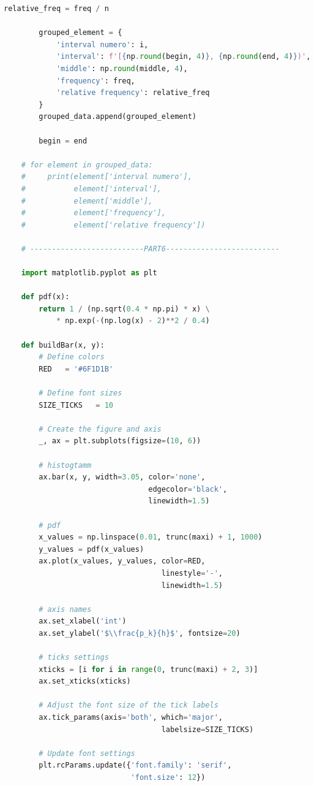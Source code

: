\documentclass[a4paper, 14pt]{extarticle}
\begin{document}
\begin{center}
\begin{lstlisting}[language=Python]
        relative_freq = freq / n

        grouped_element = {
            'interval numero': i,
            'interval': f'[{np.round(begin, 4)}, {np.round(end, 4)})',
            'middle': np.round(middle, 4),
            'frequency': freq,
            'relative frequency': relative_freq
        }
        grouped_data.append(grouped_element)

        begin = end

    # for element in grouped_data:
    #     print(element['interval numero'], 
    #           element['interval'], 
    #           element['middle'], 
    #           element['frequency'], 
    #           element['relative frequency'])

    # --------------------------PART6--------------------------

    import matplotlib.pyplot as plt

    def pdf(x):
        return 1 / (np.sqrt(0.4 * np.pi) * x) \
            * np.exp(-(np.log(x) - 2)**2 / 0.4)

    def buildBar(x, y):
        # Define colors
        RED   = '#6F1D1B'

        # Define font sizes
        SIZE_TICKS   = 10

        # Create the figure and axis
        _, ax = plt.subplots(figsize=(10, 6))

        # histogtamm
        ax.bar(x, y, width=3.05, color='none', 
                                 edgecolor='black', 
                                 linewidth=1.5)

        # pdf
        x_values = np.linspace(0.01, trunc(maxi) + 1, 1000)
        y_values = pdf(x_values)
        ax.plot(x_values, y_values, color=RED, 
                                    linestyle='-', 
                                    linewidth=1.5)

        # axis names
        ax.set_xlabel('int')
        ax.set_ylabel('$\\frac{p_k}{h}$', fontsize=20)

        # ticks settings
        xticks = [i for i in range(0, trunc(maxi) + 2, 3)]
        ax.set_xticks(xticks)

        # Adjust the font size of the tick labels
        ax.tick_params(axis='both', which='major', 
                                    labelsize=SIZE_TICKS)

        # Update font settings
        plt.rcParams.update({'font.family': 'serif', 
                             'font.size': 12})


\end{lstlisting}
\end{center}
\end{document}
